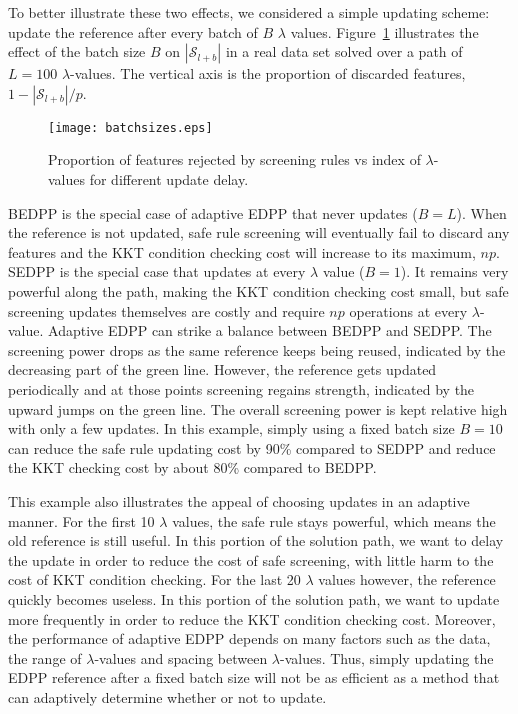 To better illustrate these two effects, we considered a simple updating scheme: update the reference after every batch of $B$ $\lambda$ values. Figure~\ref{fig:batchsizes} illustrates the effect of the batch size $B$ on $|\mathcal{S}_{l+b}|$ in a real data set solved over a path of $L=100$ $\lambda$-values. The vertical axis is the proportion of discarded features, $1-|\mathcal{S}_{l+b}|/p$.

\begin{figure}[ht]
    \centering
    \texttt{[image: batchsizes.eps]}    \caption{Proportion of features rejected by screening rules vs index of $\lambda$-values for different update delay.}
    \label{fig:batchsizes}
\end{figure}

BEDPP is the special case of adaptive EDPP that never updates ($B=L$). When the reference is not updated, safe rule screening will eventually fail to discard any features and the KKT condition checking cost will increase to its maximum, $np$. SEDPP is the special case that updates at every $\lambda$ value ($B=1$). It remains very powerful along the path, making the KKT condition checking cost small, but safe screening updates themselves are costly and require $np$ operations at every $\lambda$-value. Adaptive EDPP can strike a balance between BEDPP and SEDPP. The screening power drops as the same reference keeps being reused, indicated by the decreasing part of the green line. However, the reference gets updated periodically and at those points screening regains strength, indicated by the upward jumps on the green line. The overall screening power is kept relative high with only a few updates. In this example, simply using a fixed batch size $B=10$ can reduce the safe rule updating cost by 90\% compared to SEDPP and reduce the KKT checking cost by about 80\% compared to BEDPP.

This example also illustrates the appeal of choosing updates in an adaptive manner. For the first 10 $\lambda$ values, the safe rule stays powerful, which means the old reference is still useful. In this portion of the solution path, we want to delay the update in order to reduce the cost of safe screening, with little harm to the cost of KKT condition checking. For the last 20 $\lambda$ values however, the reference quickly becomes useless. In this portion of the solution path, we want to update more frequently in order to reduce the KKT condition checking cost. Moreover, the performance of adaptive EDPP depends on many factors such as the data, the range of $\lambda$-values and spacing between $\lambda$-values. Thus, simply updating the EDPP reference after a fixed batch size will not be as efficient as a method that can adaptively determine whether or not to update.

